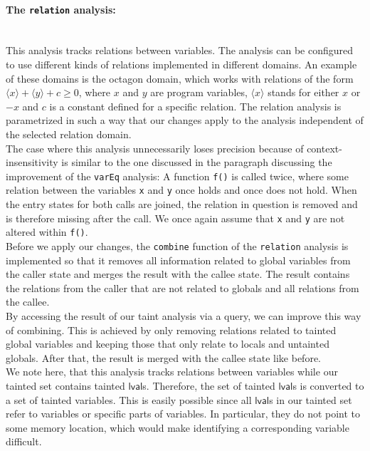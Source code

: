       \paragraph{The \texttt{relation} analysis:}\mbox{}\\
        This analysis tracks relations between variables. The analysis can be configured to use different kinds of relations implemented in different domains. An example of these domains is the octagon domain, which works with relations of the form $\langle x \rangle + \langle y \rangle + c \geq 0$, where $x$ and $y$ are program variables, $\langle x \rangle$ stands for either $x$ or $-x$ and $c$ is a constant defined for a specific relation. The relation analysis is parametrized in such a way that our changes apply to the analysis independent of the selected relation domain.\\
        The case where this analysis unnecessarily loses precision because of context-insensitivity is similar to the one discussed in the paragraph discussing the improvement of the \texttt{varEq} analysis: A function \texttt{f()} is called twice, where some relation between the variables \texttt{x} and \texttt{y} once holds and once does not hold. When the entry states for both calls are joined, the relation in question is removed and is therefore missing after the call. We once again assume that \texttt{x} and \texttt{y} are not altered within \texttt{f()}.\\
        Before we apply our changes, the \texttt{combine} function of the \texttt{relation} analysis is implemented so that it removes all information related to global variables from the caller state and merges the result with the callee state. The result contains the relations from the caller that are not related to globals and all relations from the callee.\\
        By accessing the result of our taint analysis via a query, we can improve this way of combining. This is achieved by only removing relations related to tainted global variables and keeping those that only relate to locals and untainted globals. After that, the result is merged with the callee state like before.\\
        We note here, that this analysis tracks relations between variables while our tainted set contains tainted $\textsf{lval}$s. Therefore, the set of tainted $\textsf{lval}$s is converted to a set of tainted variables. This is easily possible since all $\textsf{lval}$s in our tainted set refer to variables or specific parts of variables. In particular, they do not point to some memory location, which would make identifying a corresponding variable difficult.

